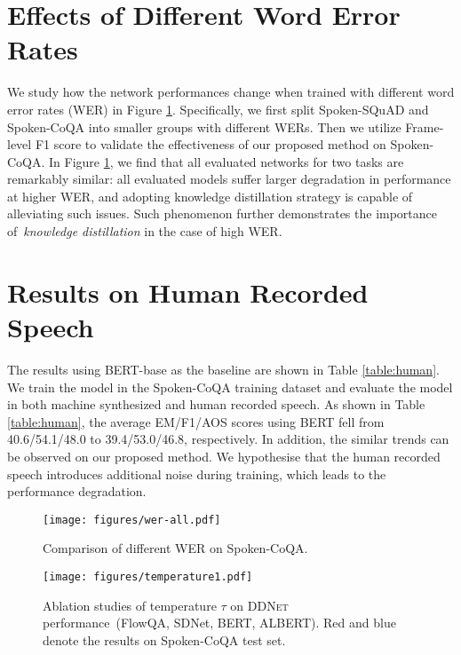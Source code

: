 \documentclass[11pt]{article}
\begin{document}
\section{Effects of Different Word Error Rates}
We study how the network performances change when trained with different word error rates (WER) in Figure \ref{fig:wer}. Specifically, we first split Spoken-SQuAD and Spoken-CoQA into smaller groups with different WERs. Then we utilize Frame-level F1 score \cite{chuang2019speechbert} to validate the effectiveness of our proposed method on Spoken-CoQA. In Figure \ref{fig:wer}, we find that all evaluated networks for two tasks are remarkably similar: all evaluated models suffer larger degradation in performance at higher WER, and adopting knowledge distillation strategy is capable of alleviating such issues. Such phenomenon further demonstrates the importance of~\textit{knowledge distillation} in the case of high WER.

\section{Results on Human Recorded Speech}
The results using BERT-base as the baseline are shown in Table \ref{table:human}. We train the model in the Spoken-CoQA training dataset and evaluate the model in both machine synthesized and human recorded speech. As shown in Table \ref{table:human}, the average EM/F1/AOS scores using BERT fell from 40.6/54.1/48.0 to 39.4/53.0/46.8, respectively. In addition, the similar trends can be observed on our proposed method. We hypothesise that the human recorded speech introduces additional noise during training, which leads to the performance degradation.

\begin{figure}[h]
    \centering
    \texttt{[image: figures/wer-all.pdf]}
    \vspace{-10pt}
    \caption{Comparison of different WER on Spoken-CoQA.}
    \vspace{-15pt}
    \label{fig:wer}
\end{figure}

\begin{figure*}[t]
    \centering
    \texttt{[image: figures/temperature1.pdf]}
    \vspace{-10pt}
    \caption{Ablation studies of temperature $\tau$ on \textsc{DDNet} performance~(FlowQA, SDNet, BERT, ALBERT). Red and blue denote the results on  Spoken-CoQA test set.}
    \label{fig:t}
    \vspace{-15pt}
\end{figure*}
\end{document}
